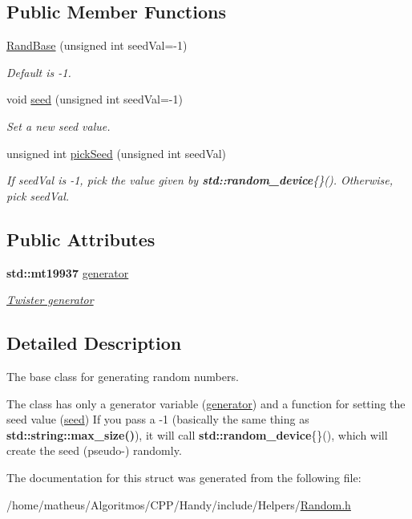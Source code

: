 \subsection*{Public Member Functions}
\begin{DoxyCompactItemize}
\item 
\hyperlink{group__RandomGroup_ga0ffb9e02dcdd71ed1fda48ca1e2f2fd5}{Rand\+Base} (unsigned int seed\+Val=-\/1)
\begin{DoxyCompactList}\small\item\em Default is \textquotesingle{}-\/1\textquotesingle{}. \end{DoxyCompactList}\item 
void \hyperlink{group__RandomGroup_ga3bb644a945c71368203459431818ddcd}{seed} (unsigned int seed\+Val=-\/1)
\begin{DoxyCompactList}\small\item\em Set a new seed value. \end{DoxyCompactList}\item 
unsigned int \hyperlink{group__RandomGroup_ga301c5bb729933e83eb5f071461169e9b}{pick\+Seed} (unsigned int seed\+Val)
\begin{DoxyCompactList}\small\item\em If {\ttfamily seed\+Val} is {\ttfamily -\/1}, pick the value given by {\bf std\+::random\+\_\+device}\{\}(). Otherwise, pick {\ttfamily seed\+Val}. \end{DoxyCompactList}\end{DoxyCompactItemize}
\subsection*{Public Attributes}
\begin{DoxyCompactItemize}
\item 
{\bf std\+::mt19937} \hyperlink{group__RandomGroup_gaecbff587706065e3d20a81de01123c9f}{generator}
\begin{DoxyCompactList}\small\item\em \hyperlink{}{Twister generator }\end{DoxyCompactList}\end{DoxyCompactItemize}


\subsection{Detailed Description}
The base class for generating random numbers. 

The class has only a generator variable (\hyperlink{group__RandomGroup_gaecbff587706065e3d20a81de01123c9f}{generator}) and a function for setting the seed value (\hyperlink{group__RandomGroup_ga3bb644a945c71368203459431818ddcd}{seed}) If you pass a {\ttfamily -\/1} (basically the same thing as {\bf std\+::string\+::max\+\_\+size()}), it will call {\bf std\+::random\+\_\+device}\{\}(), which will create the seed (pseudo-\/) randomly. 

The documentation for this struct was generated from the following file\+:\begin{DoxyCompactItemize}
\item 
/home/matheus/\+Algoritmos/\+C\+P\+P/\+Handy/include/\+Helpers/\hyperlink{Random_8h}{Random.\+h}\end{DoxyCompactItemize}
